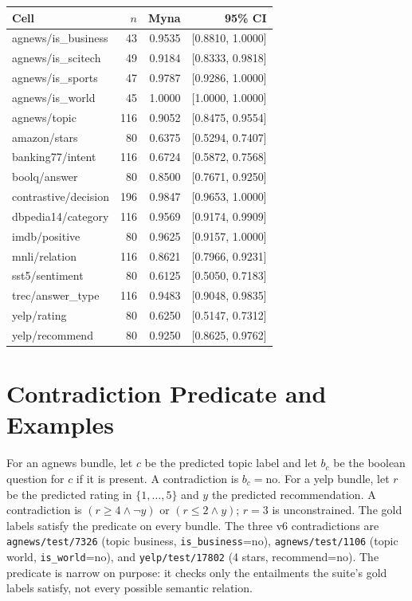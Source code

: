\begin{widetable}
\centering
\footnotesize
\caption{Per-cell local re-score with row-clustered 95\% intervals (20{,}000 replicates, seed 20261031). The interval is on the cell accuracy; the unit resampled is the row, not the question.}
\label{tab:cells}
\begin{tabular}{lrrr}
\toprule
Cell & $n$ & Myna & 95\% CI \\
\midrule
agnews/is\_business & 43 & 0.9535 & [0.8810, 1.0000] \\
agnews/is\_scitech & 49 & 0.9184 & [0.8333, 0.9818] \\
agnews/is\_sports & 47 & 0.9787 & [0.9286, 1.0000] \\
agnews/is\_world & 45 & 1.0000 & [1.0000, 1.0000] \\
agnews/topic & 116 & 0.9052 & [0.8475, 0.9554] \\
amazon/stars & 80 & 0.6375 & [0.5294, 0.7407] \\
banking77/intent & 116 & 0.6724 & [0.5872, 0.7568] \\
boolq/answer & 80 & 0.8500 & [0.7671, 0.9250] \\
contrastive/decision & 196 & 0.9847 & [0.9653, 1.0000] \\
dbpedia14/category & 116 & 0.9569 & [0.9174, 0.9909] \\
imdb/positive & 80 & 0.9625 & [0.9157, 1.0000] \\
mnli/relation & 116 & 0.8621 & [0.7966, 0.9231] \\
sst5/sentiment & 80 & 0.6125 & [0.5050, 0.7183] \\
trec/answer\_type & 116 & 0.9483 & [0.9048, 0.9835] \\
yelp/rating & 80 & 0.6250 & [0.5147, 0.7312] \\
yelp/recommend & 80 & 0.9250 & [0.8625, 0.9762] \\
\bottomrule
\end{tabular}
\end{widetable}

\section{Contradiction Predicate and Examples}
\label{app:predicate}

For an agnews bundle, let $c$ be the predicted topic label and let $b_c$ be the boolean question for $c$ if it is present. A contradiction is $b_c=\text{no}$. For a yelp bundle, let $r$ be the predicted rating in $\{1,\dots,5\}$ and $y$ the predicted recommendation. A contradiction is $(r\ge4 \land \neg y)$ or $(r\le2 \land y)$; $r=3$ is unconstrained. The gold labels satisfy the predicate on every bundle. The three v6 contradictions are \texttt{agnews/test/7326} (topic business, \texttt{is\_business}=no), \texttt{agnews/test/1106} (topic world, \texttt{is\_world}=no), and \texttt{yelp/test/17802} (4 stars, recommend=no). The predicate is narrow on purpose: it checks only the entailments the suite's gold labels satisfy, not every possible semantic relation.

